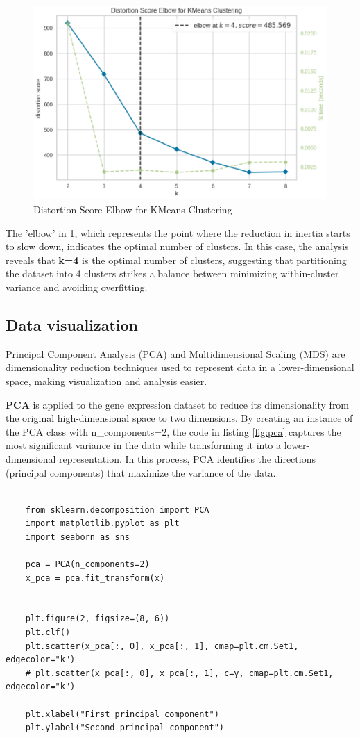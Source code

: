 \documentclass{article}
\begin{document}
\begin{figure}[H]
	\centering
	\includegraphics[width=.7\textwidth]{images/elbow.png}
	\caption{Distortion Score Elbow for KMeans Clustering}
	\label{fig:elbow}
\end{figure}



 The 'elbow' in \ref{fig:elbow}, which represents the point where the reduction in inertia starts to slow down, indicates the optimal number of clusters. In this case, the analysis reveals that \textbf{k=4} is the optimal number of clusters, suggesting that partitioning the dataset into 4 clusters strikes a balance between minimizing within-cluster variance and avoiding overfitting. 
\\

\subsection{Data visualization}
Principal Component Analysis (PCA) and Multidimensional Scaling (MDS) are dimensionality reduction techniques used to represent data in a lower-dimensional space, making visualization and analysis easier.

\textbf{PCA} is applied to the gene expression dataset to reduce its dimensionality from the original high-dimensional space to two dimensions. By creating an instance of the PCA class with n\_components=2, the code in listing \ref{fig:pca} captures the most significant variance in the data while transforming it into a lower-dimensional representation. In this process, PCA identifies the directions (principal components) that maximize the variance of the data.

\begin{lstlisting}[style=mypython, label=fig:pca_code,caption=Application of PCA method]
	
	from sklearn.decomposition import PCA
	import matplotlib.pyplot as plt
	import seaborn as sns
	
	pca = PCA(n_components=2)
	x_pca = pca.fit_transform(x)
	
	
	plt.figure(2, figsize=(8, 6))
	plt.clf()
	plt.scatter(x_pca[:, 0], x_pca[:, 1], cmap=plt.cm.Set1, edgecolor="k")
	# plt.scatter(x_pca[:, 0], x_pca[:, 1], c=y, cmap=plt.cm.Set1, edgecolor="k")
	
	plt.xlabel("First principal component")
	plt.ylabel("Second principal component")	
\end{lstlisting}
\end{document}
